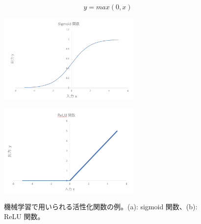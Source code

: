 \begin{equation}
    y = max(0,x)
    \label{equ:ReLU}
\end{equation}
\begin{figure}
    \centering
    \begin{minipage}[b]{0.4\linewidth}
        \centering
        \includegraphics[clip, width=7cm]{fig/4/sigmoid.png}
        \vspace{10pt}
        \subcaption{}
        \label{fig:sigmoid}
    \end{minipage}
    \hfill
    \begin{minipage}[b]{0.4\linewidth}
        \centering
        \includegraphics[clip, width=7cm]{fig/4/ReLU.png}
        \vspace{10pt}
        \subcaption{}
        \label{fig:ReLU}
    \end{minipage}
    \caption{機械学習で用いられる活性化関数の例。(a): sigmoid 関数、(b): ReLU 関数。}
    \label{fig:acctivation}
\end{figure}
